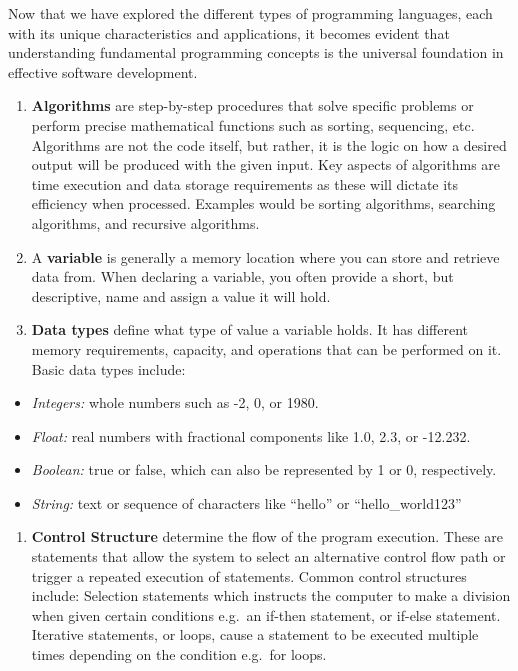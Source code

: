 \documentclass[
  letterpaper,
  DIV=11,
  numbers=noendperiod]{scrreprt}
\providecommand{\tightlist}{%
  \setlength{\itemsep}{0pt}\setlength{\parskip}{0pt}}\usepackage{longtable,booktabs,array}
\begin{document}
Now that we have explored the different types of programming languages,
each with its unique characteristics and applications, it becomes
evident that understanding fundamental programming concepts is the
universal foundation in effective software development.

\begin{enumerate}
\def\labelenumi{\arabic{enumi}.}
\item
  \textbf{Algorithms} are step-by-step procedures that solve specific
  problems or perform precise mathematical functions such as sorting,
  sequencing, etc. Algorithms are not the code itself, but rather, it is
  the logic on how a desired output will be produced with the given
  input. Key aspects of algorithms are time execution and data storage
  requirements as these will dictate its efficiency when processed.
  Examples would be sorting algorithms, searching algorithms, and
  recursive algorithms.
\item
  A \textbf{variable} is generally a memory location where you can store
  and retrieve data from. When declaring a variable, you often provide a
  short, but descriptive, name and assign a value it will hold.
\item
  \textbf{Data types} define what type of value a variable holds. It has
  different memory requirements, capacity, and operations that can be
  performed on it. Basic data types include:
\end{enumerate}

\begin{itemize}
\tightlist
\item
  \emph{Integers:} whole numbers such as -2, 0, or 1980.
\item
  \emph{Float:} real numbers with fractional components like 1.0, 2.3,
  or -12.232.
\item
  \emph{Boolean:} true or false, which can also be represented by 1 or
  0, respectively.
\item
  \emph{String:} text or sequence of characters like ``hello'' or
  ``hello\_world123''
\end{itemize}

\begin{enumerate}
\def\labelenumi{\arabic{enumi}.}
\setcounter{enumi}{3}
\tightlist
\item
  \textbf{Control Structure} determine the flow of the program
  execution. These are statements that allow the system to select an
  alternative control flow path or trigger a repeated execution of
  statements. Common control structures include: Selection statements
  which instructs the computer to make a division when given certain
  conditions e.g.~an if-then statement, or if-else statement. Iterative
  statements, or loops, cause a statement to be executed multiple times
  depending on the condition e.g.~for loops.
\end{enumerate}
\end{document}
